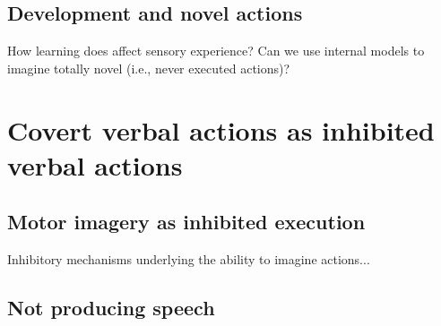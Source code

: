 \documentclass[utf8]{frontiersSCNS} %
\begin{document}
\subsection{Development and novel actions}

How learning does affect sensory experience? Can we use internal models to imagine totally novel (i.e., never executed actions)?

\section{Covert verbal actions as inhibited verbal actions}



\subsection{Motor imagery as inhibited execution}

Inhibitory mechanisms underlying the ability to imagine actions...

\subsection{Not producing speech}
\end{document}

